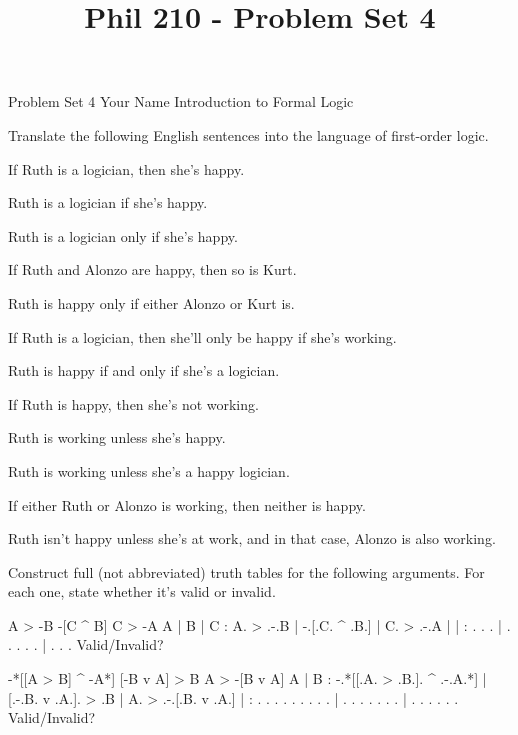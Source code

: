 
\title{Phil 210 - Problem Set 4}

\heading
Problem Set 4
Your Name
Introduction to Formal Logic
\endheading

Translate the following English sentences into the language of first-order logic.

\problems
{}
If Ruth is a logician, then she's happy.
	\answer
	$ $
	\endanswer

Ruth is a logician if she's happy.
	\answer
	$ $
	\endanswer

Ruth is a logician only if she's happy.
	\answer
	$ $
	\endanswer

If Ruth and Alonzo are happy, then so is Kurt.
	\answer
	$ $
	\endanswer

Ruth is happy only if either Alonzo or Kurt is.
	\answer
	$ $
	\endanswer

If Ruth is a logician, then she'll only be happy if she's working.
	\answer
	$ $
	\endanswer

Ruth is happy if and only if she's a logician.
	\answer
	$ $
	\endanswer

If Ruth is happy, then she's not working.
	\answer
	$ $
	\endanswer

Ruth is working unless she's happy.
	\answer
	$ $
	\endanswer

Ruth is working unless she's a happy logician.
	\answer
	$ $
	\endanswer

If either Ruth or Alonzo is working, then neither is happy.
	\answer
	$ $
	\endanswer

Ruth isn't happy unless she's at work, and in that case, Alonzo is also working.
	\answer
	$ $
	\endanswer

\endproblems

Construct full (not abbreviated) truth tables for the following arguments. For each one, state whether it's valid or invalid.

\problems
{}
\argument
 A > -B
 -[C ^ B]
\argumentline
 C > -A
\endargument
	\answer
	\truthtable
	 A | B | C : A. > .-.B | -.[.C. ^ .B.] | C. > .-.A
	\truthtableline
	   |   |   :  .   . .  |  . . .   . .  |  .   . . 
	\endtruthtable
	Valid/Invalid?
	\endanswer

\argument
 -*[[A > B] ^ -A*]
 [-B v A] > B
\argumentline
 A > -[B v A]
\endargument
	\answer
	\truthtable
	 A | B : -.*[[.A. > .B.]. ^ .-.A.*] | [.-.B. v .A.]. > .B | A. > .-.[.B. v .A.]
	\truthtableline
	   |   :  .   . .   . . .   . . .   |  . . .   . . .   .  |  .   . . . .   . 
	\endtruthtable
	Valid/Invalid?
	\endanswer

